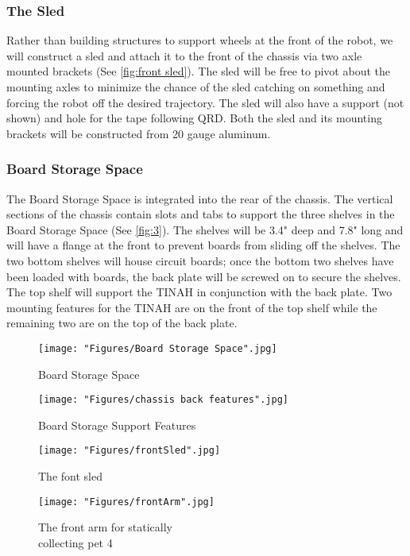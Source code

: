 \documentclass[11pt, oneside]{article} %
\begin{document}
		\subsubsection{The Sled}
		Rather than building structures to support wheels at the front of the robot, we will construct a sled and attach it to the front of the chassis via two axle mounted brackets (See \autoref{fig:front sled}). The sled will be free to pivot about the mounting axles to minimize the chance of the sled catching on something and forcing the robot off the desired trajectory. The sled will also have a support (not shown) and hole for the tape following QRD. Both the sled and its mounting brackets will be constructed from 20 gauge aluminum.
		
		\subsubsection{Board Storage Space}

		The Board Storage Space is integrated into the rear of the chassis. The vertical sections of the chassis contain slots and tabs to support the three shelves in the Board Storage Space (See \autoref{fig:3}). The shelves will be 3.4" deep and 7.8" long and will have a flange at the front to prevent boards from sliding off the shelves. The two bottom shelves will house circuit boards; once the bottom two shelves have been loaded with boards, the back plate will be screwed on to secure the shelves. The top shelf will support the TINAH in conjunction with the back plate. Two mounting features for the TINAH are on the front of the top shelf while the remaining two are on the top of the back plate.
			
		\begin{figure}[!ht]
			\centering
			\begin{minipage}[t]{.5\textwidth}
				\centering
				\texttt{[image: "Figures/Board Storage Space".jpg]}
				\caption[Board Storage Space]{Board Storage Space}
				\label{fig:2}
			\end{minipage}%
			\begin{minipage}[t]{.5\textwidth}
				\centering
				\texttt{[image: "Figures/chassis back features".jpg]}
				\caption[Board Storage Support Features]{Board Storage Support Features}
				\label{fig:3}
			\end{minipage}
		\end{figure}
		
		\begin{figure}[!ht]
			\begin{minipage}[t]{.5\textwidth}
				\centering
				\texttt{[image: "Figures/frontSled".jpg]}
				\caption[The Sled]{The font sled}
				\label{fig:front sled}
			\end{minipage}%
			\begin{minipage}[t]{.75\textwidth}
				\centering
				\texttt{[image: "Figures/frontArm".jpg]}
				\caption[Front Arm]{The front arm for statically \\ collecting pet 4}
				\label{fig:front arm}
			\end{minipage}
		\end{figure}
		
\end{document}
